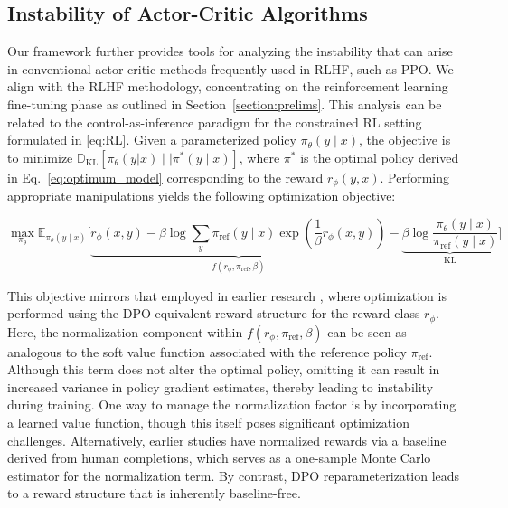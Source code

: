 \subsection{Instability of Actor-Critic Algorithms}
Our framework further provides tools for analyzing the instability that can arise in conventional actor-critic methods frequently used in RLHF, such as PPO. We align with the RLHF methodology, concentrating on the reinforcement learning fine-tuning phase as outlined in Section~\ref{section:prelims}. This analysis can be related to the control-as-inference paradigm \cite{levine2018reinforcement} for the constrained RL setting formulated in \ref{eq:RL}. Given a parameterized policy $\pi_{\theta}(y\mid x)$, the objective is to minimize $\mathbb{D}_{\text{KL}}[\pi_{\theta}(y|x) \mid \mid \pi^*(y\mid x)]$, where $\pi^*$ is the optimal policy derived in Eq.~\ref{eq:optimum_model} corresponding to the reward $r_{\phi}(y, x)$. Performing appropriate manipulations yields the following optimization objective:

\begin{equation}\label{eq:AC}
    \max_{\pi_{\theta}}\mathbb{E}_{\pi_{\theta}(y\mid x)}\bigg[\underbrace{r_{\phi}(x, y) -\beta\log\sum_{y}\pi_\text{ref}(y\mid x)\exp\left(\frac{1}{\beta}r_{\phi}(x, y)\right)}_{f(r_{\phi}, \pi_\text{ref}, \beta)} - \underbrace{\beta\log\frac{\pi_{\theta}(y\mid x)}{\pi_\text{ref}(y\mid x)}}_{\text{KL}}\bigg]
\end{equation}

This objective mirrors that employed in earlier research  
\citep{ziegler2020finetuning, stiennon2022learning, bai2022training, ouyang2022training}, where optimization is performed using the DPO-equivalent reward structure for the reward class $r_{\phi}$. Here, the normalization component within $f(r_{\phi}, \pi_\text{ref}, \beta)$ can be seen as analogous to the soft value function associated with the reference policy $\pi_\text{ref}$. Although this term does not alter the optimal policy, omitting it can result in increased variance in policy gradient estimates, thereby leading to instability during training. One way to manage the normalization factor is by incorporating a learned value function, though this itself poses significant optimization challenges. Alternatively, earlier studies have normalized rewards via a baseline derived from human completions, which serves as a one-sample Monte Carlo estimator for the normalization term. By contrast, DPO reparameterization leads to a reward structure that is inherently baseline-free.

